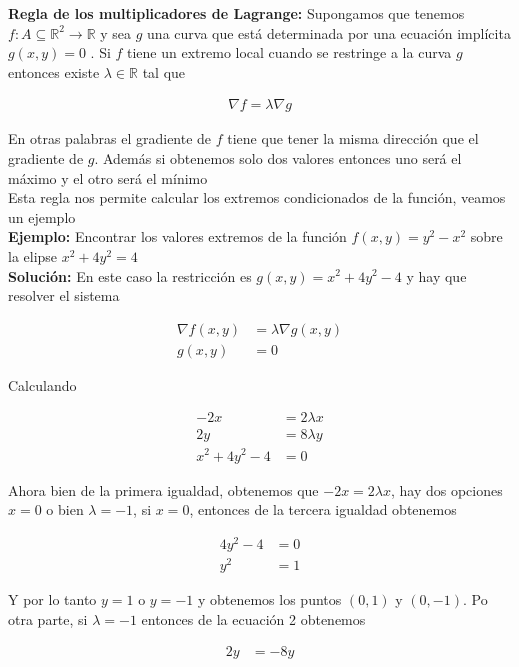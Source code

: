 \documentclass{article}
\theoremstyle{definition}
\begin{document}
\textbf{Regla de los multiplicadores de Lagrange: } Supongamos que tenemos $f: A \subseteq \mathbb{R}^2 \to \mathbb{R}$ y sea $g$ una curva que está determinada por una ecuación implícita $g(x,y)=0$ . Si $f$ tiene un extremo local cuando se restringe a la curva $g$ entonces existe $\lambda \in \mathbb{R}$ tal que

\begin{align*}
    \nabla f = \lambda \nabla g
\end{align*}

En otras palabras el gradiente de $f$ tiene que tener la misma dirección que el gradiente de $g$. Además si obtenemos solo dos valores entonces uno será el máximo y el otro será el mínimo \\

Esta regla nos permite calcular los extremos condicionados de la función, veamos un ejemplo \\

\textbf{Ejemplo:} Encontrar los valores extremos de la función $f(x,y)= y^2-x^2$ sobre la elipse $x^2+4y^2=4$ \\

\textbf{Solución: } En este caso la restricción es $g(x,y)= x^2+4y^2-4$ y hay que resolver el sistema

\begin{align*}
    \nabla f(x,y) &= \lambda \nabla g(x,y) \\
    g(x,y) &= 0
\end{align*}

Calculando

\begin{align*}
    -2x &=2\lambda x \\
    2y &= 8\lambda y \\
    x^2+4y^2-4 &= 0
\end{align*}

Ahora bien de la primera igualdad, obtenemos que $-2x=2\lambda x$, hay dos opciones $x=0$ o bien $\lambda = -1$, si $x=0$, entonces de la tercera igualdad obtenemos

\begin{align*}
    4y^2-4 &= 0 \\
    y^2 &=1
\end{align*}

Y por lo tanto $y=1$ o $y=-1$ y obtenemos los puntos $(0,1)$ y $(0,-1)$. Po otra parte, si $\lambda =-1$ entonces de la ecuación 2 obtenemos

\begin{align*}
    2y &= -8 y
\end{align*}
\end{document}
